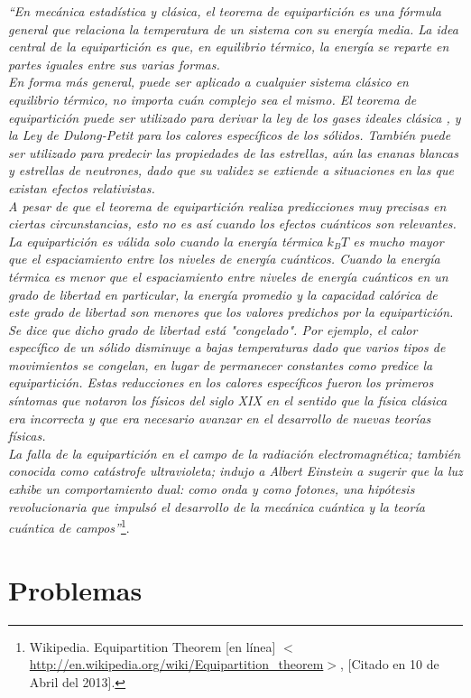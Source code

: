 \documentclass[11pt,graphicx,caption,rotating]{article}
\begin{document}
\textit{``En mecánica estadística y clásica, el teorema de equipartición es una fórmula general que relaciona la temperatura de un sistema con su energía media. La idea central de la equipartición es que, en equilibrio térmico, la energía se reparte en partes iguales entre sus varias formas.\\
En forma más general, puede ser aplicado a cualquier sistema clásico en equilibrio térmico, no importa cuán complejo sea el mismo. El teorema de equipartición puede ser utilizado para derivar la ley de los gases ideales clásica , y la Ley de Dulong-Petit para los calores específicos de los sólidos. También puede ser utilizado para predecir las propiedades de las estrellas, aún las enanas blancas y estrellas de neutrones, dado que su validez se extiende a situaciones en las que existan efectos relativistas.\\
A pesar de que el teorema de equipartición realiza predicciones muy precisas en ciertas circunstancias, esto no es así cuando los efectos cuánticos son relevantes. La equipartición es válida solo cuando la energía térmica $k_B T$ es mucho mayor que el espaciamiento entre los niveles de energía cuánticos. Cuando la energía térmica es menor que el espaciamiento entre niveles de energía cuánticos en un grado de libertad en particular, la energía promedio y la capacidad calórica de este grado de libertad son menores que los valores predichos por la equipartición. Se dice que dicho grado de libertad está "congelado". Por ejemplo, el calor específico de un sólido disminuye a bajas temperaturas dado que varios tipos de movimientos se congelan, en lugar de permanecer constantes como predice la equipartición. Estas reducciones en los calores específicos fueron los primeros síntomas que notaron los físicos del siglo XIX en el sentido que la física clásica era incorrecta y que era necesario avanzar en el desarrollo de nuevas teorías físicas.\\
La falla de la equipartición en el campo de la radiación electromagnética; también conocida como catástrofe ultravioleta; indujo a Albert Einstein a sugerir que la luz exhibe un comportamiento dual: como onda y como fotones, una hipótesis revolucionaria que impulsó el desarrollo de la mecánica cuántica y la teoría cuántica de campos''}\footnote{\cite{page1} Wikipedia. Equipartition Theorem [en línea] $<$ \url{http://en.wikipedia.org/wiki/Equipartition_theorem}$>$, [Citado en 10 de Abril del 2013].}.

\section{Problemas}
\end{document}
